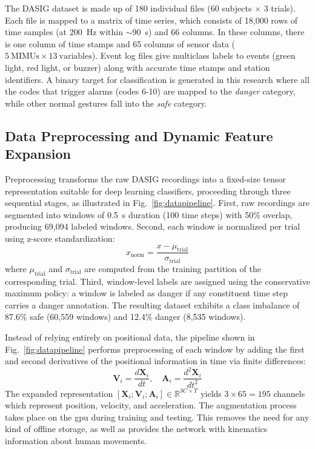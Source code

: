 \documentclass[letterpaper,journal]{IEEEtran}
\begin{document}
The DASIG dataset is made up of 180 individual files (60 subjects $\times$ 3 trials). Each file is mapped to a matrix of time series, which consists of 18,000 rows of time samples (at 200~Hz within $\sim$90~s) and 66 columns. In these columns, there is one column of time stamps and 65 columns of sensor data ($5~\text{MIMUs} \times 13~\text{variables}$). Event log files give multiclass labels to events (green light, red light, or buzzer) along with accurate time stamps and station identifiers. A binary target for classification is generated in this research where all the codes that trigger alarms (codes 6-10) are mapped to the \textit{danger} category, while other normal gestures fall into the \textit{safe} category.

\subsection{Data Preprocessing and Dynamic Feature Expansion}

Preprocessing transforms the raw DASIG recordings into a fixed-size tensor representation suitable for deep learning classifiers, proceeding through three sequential stages, as illustrated in Fig.~\ref{fig:datapipeline}. First, raw recordings are segmented into windows of 0.5~s duration (100 time steps) with 50\% overlap, producing 69,094 labeled windows. Second, each window is normalized per trial using z-score standardization:
\begin{equation}
    x_{\text{norm}} = \frac{x - \mu_{\text{trial}}}{\sigma_{\text{trial}}}
\end{equation}
where $\mu_{\text{trial}}$ and $\sigma_{\text{trial}}$ are computed from the training partition of the corresponding trial. Third, window-level labels are assigned using the conservative maximum policy: a window is labeled as danger if any constituent time step carries a danger annotation. The resulting dataset exhibits a class imbalance of 87.6\% safe (60,559 windows) and 12.4\% danger (8,535 windows).

Instead of relying entirely on positional data, the pipeline shown in Fig.~\ref{fig:datapipeline} performs preprocessing of each window by adding the first and second derivatives of the positional information in time via finite differences:
\begin{equation}
    \mathbf{V}_i = \frac{d\mathbf{X}_i}{dt}, \quad \mathbf{A}_i = \frac{d^2\mathbf{X}_i}{dt^2}
\end{equation}
The expanded representation $[\mathbf{X}_i; \mathbf{V}_i; \mathbf{A}_i] \in \mathbb{R}^{3C \times T}$ yields $3 \times 65 = 195$ channels which represent position, velocity, and acceleration. The augmentation process takes place on the \ac{gpu} during training and testing. This removes the need for any kind of offline storage, as well as provides the network with kinematics information about human movements.
\end{document}
